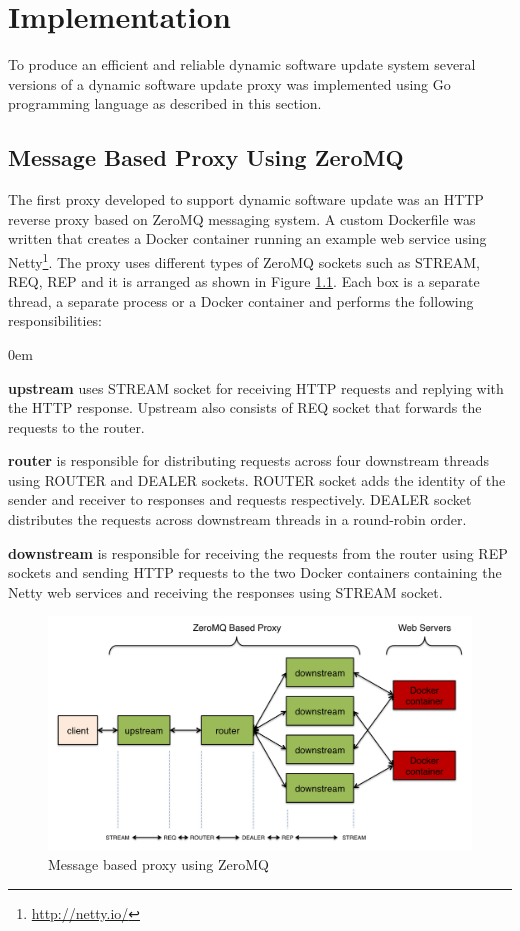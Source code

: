 \documentclass[a4paper,11pt,twoside]{report}
\begin{document}
\chapter{Implementation} \label{Implementation}
To produce an efficient and reliable dynamic software update system several versions of a dynamic software update proxy was implemented using Go programming language as described in this section. 

\section{Message Based Proxy Using ZeroMQ}
The first proxy developed to support dynamic software update was an HTTP reverse proxy based on ZeroMQ messaging system. A custom Dockerfile was written that creates a Docker container running an example web service using Netty\footnote{\url{http://netty.io/}}. The proxy uses different types of ZeroMQ sockets such as STREAM, REQ, REP and it is arranged as shown in Figure \ref{prototype}. Each box is a separate thread, a separate process or a Docker container and performs the following responsibilities:
 
\begin{list}{-}{}
  \itemsep0em
  \item \textbf{upstream} uses STREAM socket for receiving HTTP requests and replying with the HTTP response. Upstream also consists of REQ socket that forwards the requests to the router. 
  
  \item \textbf{router} is responsible for distributing requests across four downstream threads using ROUTER and DEALER sockets. ROUTER socket adds the identity of the sender and receiver to responses and requests respectively. DEALER socket distributes the requests across downstream threads in a round-robin order.
 
  \item \textbf{downstream} is responsible for receiving the requests from the router using REP sockets and sending HTTP requests to the two Docker containers containing the Netty web services and receiving the responses using STREAM socket.
\end{list}

\begin{figure}[!ht]
  \centering
     \includegraphics[scale=0.31]{prototype}
  \caption{Message based proxy using ZeroMQ}
  \label{prototype}
\end{figure}
\end{document}
